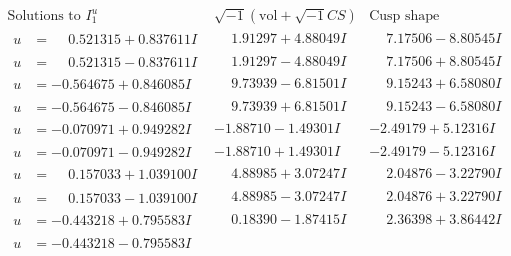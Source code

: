 \documentclass[1p]{elsarticle_modified}
\theoremstyle{definition}
\newcommand{\I}{\sqrt{-1}}
\begin{document}
$$\begin{array}{c|c|c}  
\text{Solutions to }I^u_{1}& \I (\text{vol} + \sqrt{-1}CS) & \text{Cusp shape}\\
 \hline 
\begin{aligned}
u &= \phantom{-}0.521315 + 0.837611 I\end{aligned}
 & \phantom{-}1.91297 + 4.88049 I & \phantom{-}7.17506 - 8.80545 I \\ \hline\begin{aligned}
u &= \phantom{-}0.521315 - 0.837611 I\end{aligned}
 & \phantom{-}1.91297 - 4.88049 I & \phantom{-}7.17506 + 8.80545 I \\ \hline\begin{aligned}
u &= -0.564675 + 0.846085 I\end{aligned}
 & \phantom{-}9.73939 - 6.81501 I & \phantom{-}9.15243 + 6.58080 I \\ \hline\begin{aligned}
u &= -0.564675 - 0.846085 I\end{aligned}
 & \phantom{-}9.73939 + 6.81501 I & \phantom{-}9.15243 - 6.58080 I \\ \hline\begin{aligned}
u &= -0.070971 + 0.949282 I\end{aligned}
 & -1.88710 - 1.49301 I & -2.49179 + 5.12316 I \\ \hline\begin{aligned}
u &= -0.070971 - 0.949282 I\end{aligned}
 & -1.88710 + 1.49301 I & -2.49179 - 5.12316 I \\ \hline\begin{aligned}
u &= \phantom{-}0.157033 + 1.039100 I\end{aligned}
 & \phantom{-}4.88985 + 3.07247 I & \phantom{-}2.04876 - 3.22790 I \\ \hline\begin{aligned}
u &= \phantom{-}0.157033 - 1.039100 I\end{aligned}
 & \phantom{-}4.88985 - 3.07247 I & \phantom{-}2.04876 + 3.22790 I \\ \hline\begin{aligned}
u &= -0.443218 + 0.795583 I\end{aligned}
 & \phantom{-}0.18390 - 1.87415 I & \phantom{-}2.36398 + 3.86442 I \\ \hline\begin{aligned}
u &= -0.443218 - 0.795583 I\end{aligned}

\end{array}$$
\end{document}
